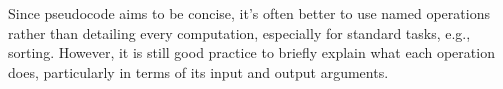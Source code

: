 


\noindent Since pseudocode aims to be concise, it's often better to use named operations rather than detailing every computation, especially for standard tasks, e.g., sorting.
However, it is still good practice to briefly explain what each operation does, particularly in terms of its input and output arguments.
